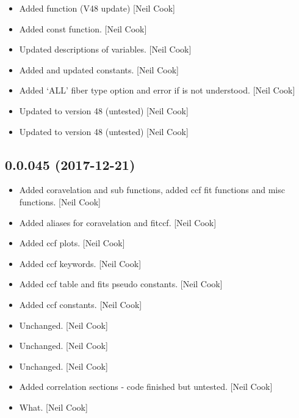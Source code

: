 \documentclass[a4paper,10pt,english]{report}
\begin{document}
\begin{itemize}
\item {} 
Added  function (V48 update) {[}Neil Cook{]}

\item {} 
Added  const function. {[}Neil Cook{]}

\item {} 
Updated descriptions of  variables. {[}Neil Cook{]}

\item {} 
Added and updated  constants. {[}Neil Cook{]}

\item {} 
Added ‘ALL’ fiber type option and error if  is not
understood. {[}Neil Cook{]}

\item {} 
Updated to version 48 (untested) {[}Neil Cook{]}

\item {} 
Updated to version 48 (untested) {[}Neil Cook{]}

\end{itemize}


\subsection{0.0.045 (2017-12-21)}
\label{\detokenize{misc/changelog:id506}}\begin{itemize}
\item {} 
Added coravelation and sub functions, added ccf fit functions and misc
functions. {[}Neil Cook{]}

\item {} 
Added aliases for coravelation and fitccf. {[}Neil Cook{]}

\item {} 
Added ccf plots. {[}Neil Cook{]}

\item {} 
Added ccf keywords. {[}Neil Cook{]}

\item {} 
Added ccf table and fits pseudo constants. {[}Neil Cook{]}

\item {} 
Added ccf constants. {[}Neil Cook{]}

\item {} 
Unchanged. {[}Neil Cook{]}

\item {} 
Unchanged. {[}Neil Cook{]}

\item {} 
Unchanged. {[}Neil Cook{]}

\item {} 
Added correlation sections - code finished but untested. {[}Neil Cook{]}

\item {} 
What. {[}Neil Cook{]}

\end{itemize}
\end{document}
